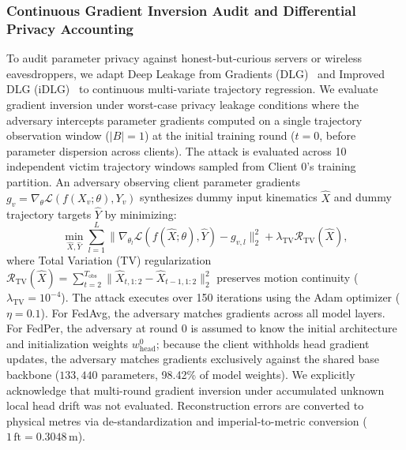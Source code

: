 \documentclass[journal]{IEEEtran}
\begin{document}
\subsubsection{Continuous Gradient Inversion Audit and Differential Privacy Accounting}
To audit parameter privacy against honest-but-curious servers or wireless eavesdroppers, we adapt Deep Leakage from Gradients (DLG)~\cite{zhu2019deep} and Improved DLG (iDLG)~\cite{zhao2020idlg} to continuous multi-variate trajectory regression. We evaluate gradient inversion under worst-case privacy leakage conditions where the adversary intercepts parameter gradients computed on a single trajectory observation window ($|B|=1$) at the initial training round ($t=0$, before parameter dispersion across clients). The attack is evaluated across 10 independent victim trajectory windows sampled from Client 0's training partition. An adversary observing client parameter gradients $g_v = \nabla_\theta \mathcal{L}(f(X_v; \theta), Y_v)$ synthesizes dummy input kinematics $\hat{X}$ and dummy trajectory targets $\hat{Y}$ by minimizing:
\begin{equation}
\min_{\hat{X}, \hat{Y}} \sum_{l=1}^L \|\nabla_{\theta_l} \mathcal{L}(f(\hat{X}; \theta), \hat{Y}) - g_{v, l}\|_2^2 + \lambda_{\mathrm{TV}} \mathcal{R}_{\mathrm{TV}}(\hat{X}),
\label{eq:dlg_loss}
\end{equation}
where Total Variation (TV) regularization $\mathcal{R}_{\mathrm{TV}}(\hat{X}) = \sum_{t=2}^{T_{\mathrm{obs}}} \|\hat{X}_{t, 1:2} - \hat{X}_{t-1, 1:2}\|_2^2$ preserves motion continuity ($\lambda_{\mathrm{TV}} = 10^{-4}$). The attack executes over 150 iterations using the Adam optimizer ($\eta=0.1$). For FedAvg, the adversary matches gradients across all model layers. For FedPer, the adversary at round 0 is assumed to know the initial architecture and initialization weights $w_{\mathrm{head}}^0$; because the client withholds head gradient updates, the adversary matches gradients exclusively against the shared base backbone ($133,440$ parameters, 98.42\% of model weights). We explicitly acknowledge that multi-round gradient inversion under accumulated unknown local head drift was not evaluated. Reconstruction errors are converted to physical metres via de-standardization and imperial-to-metric conversion ($1\,\text{ft} = 0.3048\,\text{m}$).
\end{document}

